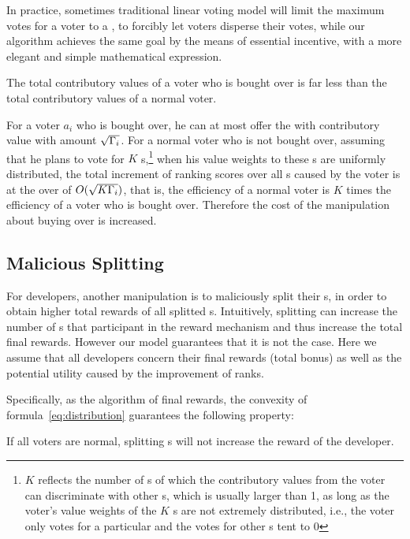 In practice, sometimes traditional  linear voting model will limit the maximum votes for a voter to a \dapp, to forcibly let voters disperse their votes, while our algorithm achieves the same goal by the means of essential incentive, with a more elegant and simple mathematical expression.


\begin{corollary}
	The total contributory values of a  voter who is bought over is far less than the total contributory values of a normal voter.
\end{corollary}
For a voter $a_i$ who is bought over, he can at most offer the \dapp with contributory value with amount $\sqrt{\Gamma_i}$. For a normal voter who is not bought over, assuming that he plans to vote for $K$ {\dapp}s,\footnote{$K$ reflects the number of {\dapp}s of which the contributory values from the voter can discriminate with other {\dapp}s, which is usually larger than 1, as long as the voter's value weights of the $K$ {\dapp}s are not extremely distributed, i.e., the voter only votes for a particular \dapp and the votes for other {\dapp}s tent to 0} when  his value weights to these {\dapp}s are uniformly distributed, the total increment of ranking scores  over all {\dapp}s caused by the voter is at the over of $O(\sqrt{K\Gamma_i})$, that is, the efficiency of a normal voter is $K$ times the efficiency of a voter who is bought over. Therefore the cost of the manipulation about buying over is increased.

\subsection{Malicious Splitting}
\label{subsec:5.2}
\noindent For developers, another manipulation is to maliciously split their {\dapp}s, in order to obtain higher total rewards of all splitted {\dapp}s. Intuitively, splitting can increase the number of {\dapp}s that participant in the reward mechanism and thus increase the total final rewards. However our model guarantees that it is not the case. Here we assume that all developers concern their final rewards (total bonus) as well as the potential utility caused by the improvement of ranks.

Specifically, as the algorithm of final rewards, the convexity of formula~\ref{eq:distribution} guarantees the following property:
\begin{property}
	\label{p2}
    If all voters are normal, splitting {\dapp}s will not increase the reward of the developer.
\end{property}

